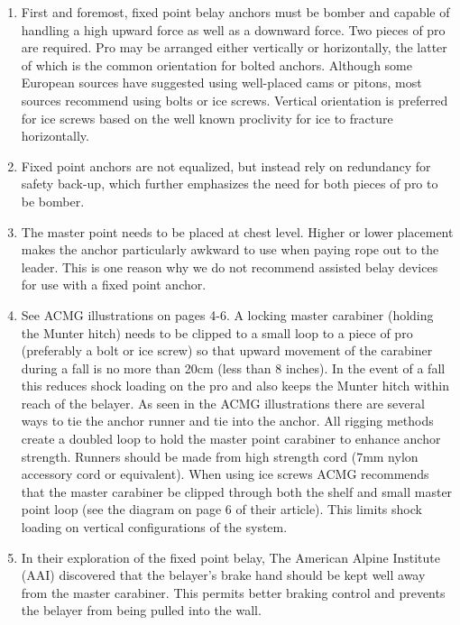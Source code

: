 \documentclass[nonacm,acmtog]{acmart}
\begin{document}
\begin{enumerate}
\item First and foremost, fixed point belay anchors must be bomber and capable
of handling a high upward force as well as a downward force. Two pieces of pro
are required. Pro may be arranged either vertically or horizontally, the latter
of which is the common orientation for bolted anchors. Although some European
sources have suggested using well-placed cams or pitons, most sources recommend
using bolts or ice screws. Vertical orientation is preferred for ice screws
based on the well known proclivity for ice to fracture horizontally.

\item  Fixed point anchors are not equalized, but instead rely on redundancy
for safety back-up, which further emphasizes the need for both pieces of pro to
be bomber.

\item The master point needs to be placed at chest level. Higher or lower
placement makes the anchor particularly awkward to use when paying rope out to
the leader. This is one reason why we do not recommend assisted belay devices
for use with a fixed point anchor.

\item See ACMG illustrations on pages 4-6.  A locking master carabiner (holding
the Munter hitch) needs to be clipped to a small loop to a piece of pro
(preferably a bolt or ice screw) so that upward movement of the carabiner
during a fall is no more than 20cm (less than 8 inches). In the event of a fall
this reduces shock loading on the pro and also keeps the Munter hitch within
reach of the belayer. As seen in the ACMG illustrations there are several ways
to tie the anchor runner and tie into the anchor. All rigging methods create a
doubled loop to hold the master point carabiner to enhance anchor strength.
Runners should be made from high strength cord (7mm nylon accessory cord or
equivalent). When using ice screws ACMG recommends that the master carabiner be
clipped through both the shelf and small master point loop (see the diagram on
page  6 of their article). This limits shock loading on vertical configurations
of the system.

\item In their exploration of the fixed point belay, The American Alpine
Institute (AAI) discovered that the belayer’s brake hand should be kept well
away from the master carabiner. This permits better braking control and
prevents the belayer from being pulled into the wall.


\end{enumerate}
\end{document}
